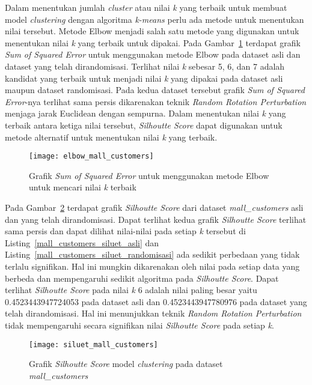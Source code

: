 Dalam menentukan jumlah \textit{cluster} atau nilai \textit{k} yang terbaik untuk membuat model \textit{clustering} dengan algoritma \textit{k-means} perlu ada metode untuk menentukan nilai tersebut. Metode Elbow menjadi salah satu metode yang digunakan untuk  menentukan nilai \textit{k} yang terbaik untuk dipakai. Pada Gambar~\ref{fig:elbow_mall_customers} terdapat grafik \textit{Sum of Squared Error} untuk menggunakan metode Elbow pada dataset asli dan dataset yang telah dirandomisasi. Terlihat nilai \textit{k} sebesar 5, 6, dan 7 adalah kandidat yang terbaik untuk menjadi nilai \textit{k} yang dipakai pada dataset asli maupun dataset randomisasi. Pada kedua dataset tersebut grafik \textit{Sum of Squared Error}-nya terlihat sama persis dikarenakan teknik \textit{Random Rotation Perturbation} menjaga jarak Euclidean dengan sempurna. Dalam menentukan nilai \textit{k} yang terbaik antara ketiga nilai tersebut, \textit{Silhoutte Score} dapat digunakan untuk metode alternatif untuk menentukan nilai \textit{k} yang terbaik.

\begin{figure}
	\centering
	\texttt{[image: elbow\_mall\_customers]}
	\caption{Grafik \textit{Sum of Squared Error} untuk menggunakan metode Elbow untuk mencari nilai \textit{k} terbaik}
	\label{fig:elbow_mall_customers}
\end{figure}

Pada Gambar~\ref{fig:siluet_mall_customers} terdapat grafik \textit{Silhoutte Score} dari dataset \textit{mall\_customers} asli dan yang telah dirandomisasi. Dapat terlihat kedua grafik \textit{Silhoutte Score} terlihat sama persis dan dapat dilihat nilai-nilai pada setiap \textit{k} tersebut di Listing~\ref{mall_customers_siluet_asli} dan Listing~\ref{mall_customers_siluet_randomisasi} ada sedikit perbedaan yang tidak terlalu signifikan. Hal ini mungkin dikarenakan oleh nilai pada setiap data yang berbeda dan mempengaruhi sedikit algoritma pada \textit{Silhoutte Score}. Dapat terlihat \textit{Silhoutte Score} pada nilai \textit{k} 6 adalah nilai paling besar yaitu 0.4523443947724053 pada dataset asli dan 0.4523443947780976 pada dataset yang telah dirandomisasi. Hal ini menunjukkan teknik \textit{Random Rotation Perturbation} tidak mempengaruhi secara signifikan nilai \textit{Silhoutte Score} pada setiap \textit{k}.

\begin{figure}
	\centering
	\texttt{[image: siluet\_mall\_customers]}
	\caption{Grafik \textit{Silhoutte Score} model \textit{clustering} pada dataset \textit{mall\_customers}}
	\label{fig:siluet_mall_customers}
\end{figure}
	
